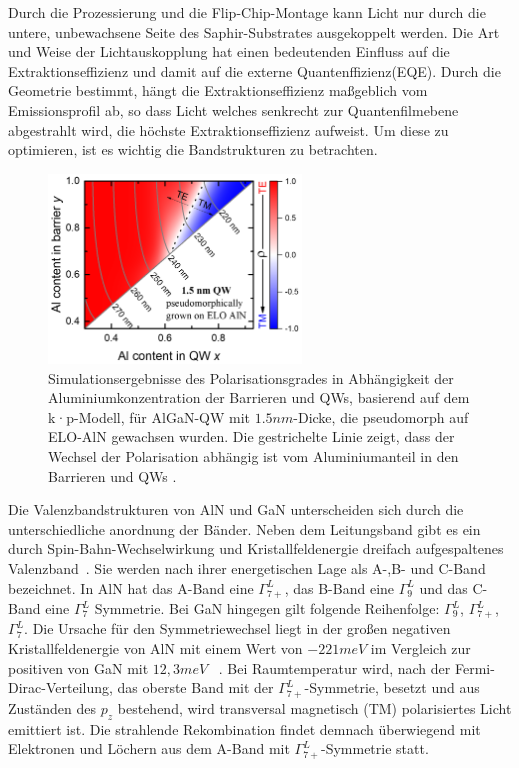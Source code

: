 \vspace{0.1cm}
\noindent
Durch die Prozessierung und die Flip-Chip-Montage kann Licht nur durch die untere, unbewachsene Seite des Saphir-Substrates ausgekoppelt werden. Die Art und Weise der Lichtauskopplung hat einen bedeutenden Einfluss auf die Extraktionseffizienz und damit auf die externe Quantenffizienz(EQE). Durch die Geometrie bestimmt, hängt die Extraktionseffizienz maßgeblich vom Emissionsprofil ab, so dass Licht welches senkrecht zur Quantenfilmebene abgestrahlt wird, die höchste Extraktionseffizienz aufweist. 
Um diese zu optimieren, ist es wichtig die Bandstrukturen zu betrachten.
%
\begin{figure}[htb]
  \centering
  \begin{minipage}{\linewidth}
      \centering
        \includegraphics[width=0.6\textwidth]{Bilder/christophPolarisationSimu.png}
      \caption{Simulationsergebnisse des Polarisationsgrades in Abhängigkeit der Aluminiumkonzentration der Barrieren und QWs, basierend auf
dem k·p-Modell, für AlGaN-QW mit $1.5nm$-Dicke, die pseudomorph auf ELO-AlN gewachsen wurden. Die gestrichelte Linie zeigt, dass der Wechsel der Polarisation abhängig ist vom Aluminiumanteil in den Barrieren und QWs \cite{doi:10.1063/1.4932651} .}
      \label{fig:simuchr}
  \end{minipage}
\end{figure}
%
Die Valenzbandstrukturen von AlN und GaN unterscheiden sich durch die unterschiedliche anordnung der Bänder. Neben dem Leitungsband gibt es ein durch Spin-Bahn-Wechselwirkung und Kristallfeldenergie dreifach aufgespaltenes Valenzband~\cite{doi:10.1063/1.117689}. Sie werden nach ihrer energetischen Lage als A-,B- und C-Band bezeichnet. In AlN hat das A-Band eine $\Gamma^{L}_{7+}$, das B-Band eine $\Gamma^{L}_{9}$ und das C-Band eine $\Gamma^{L}_{7}$ Symmetrie. Bei GaN hingegen gilt folgende Reihenfolge:  $\Gamma^{L}_{9}$, $\Gamma^{L}_{7+}$, $\Gamma^{L}_{7}$. Die Ursache für den Symmetriewechsel liegt in der großen negativen Kristallfeldenergie von AlN mit einem Wert von $-221meV$ \cite{PhysRevB.87.235209} im Vergleich zur positiven von GaN mit $12,3meV$ ~\cite{PhysRevB.81.155202}. Bei Raumtemperatur wird, nach der Fermi-Dirac-Verteilung, das oberste Band mit der $\Gamma^{L}_{7+}$-Symmetrie, besetzt und aus Zuständen des $p_z$ bestehend, wird transversal magnetisch (TM) polarisiertes Licht emittiert ist. Die strahlende Rekombination findet demnach überwiegend mit Elektronen und Löchern aus dem A-Band mit $\Gamma^{L}_{7+}$-Symmetrie statt.
